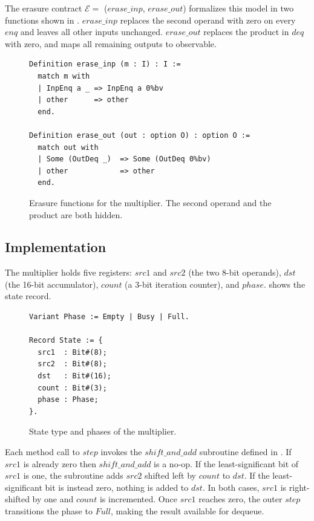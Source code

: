 \documentclass[fontset=fira-newtxsf]{mitthesis}
\theoremstyle{definition}
\theoremstyle{plain}
\begin{document}
The erasure contract $\mathcal{E} =$ ($\mathit{erase\_inp}$, $\mathit{erase\_out}$) formalizes this model in two functions shown in .
$\mathit{erase\_inp}$ replaces the second operand with zero on every $\mathit{enq}$ and leaves all other inputs unchanged.
$\mathit{erase\_out}$ replaces the product in $\mathit{deq}$ with zero, and maps all remaining outputs to observable.

\begin{figure}[ht]
\begin{verbatim}
Definition erase_inp (m : I) : I :=
  match m with
  | InpEnq a _ => InpEnq a 0%bv
  | other      => other
  end.

Definition erase_out (out : option O) : option O :=
  match out with
  | Some (OutDeq _)  => Some (OutDeq 0%bv)
  | other            => other
  end.
\end{verbatim}
\caption[Multiplier erasure functions]{Erasure functions for the multiplier. The second operand and the product are both hidden.}
\label{fig:mult-erasure}
\end{figure}

\subsection{Implementation}

The multiplier holds five registers: $\mathit{src1}$ and $\mathit{src2}$ (the two 8-bit operands), $\mathit{dst}$ (the 16-bit accumulator), $\mathit{count}$ (a 3-bit iteration counter), and $\mathit{phase}$.
 shows the state record.

\begin{figure}[ht]
\begin{verbatim}
Variant Phase := Empty | Busy | Full.

Record State := {
  src1  : Bit#(8);
  src2  : Bit#(8);
  dst   : Bit#(16);
  count : Bit#(3);
  phase : Phase;
}.
\end{verbatim}
\caption[Multiplier state type]{State type and phases of the multiplier.}
\label{fig:mult-state}
\end{figure}

Each method call to $\mathit{step}$ invokes the $\mathit{shift\_and\_add}$ subroutine defined in .
If $\mathit{src1}$ is already zero then $\mathit{shift\_and\_add}$ is a no-op. If the least-significant bit of $\mathit{src1}$ is one, the subroutine adds $\mathit{src2}$ shifted left by $\mathit{count}$ to $\mathit{dst}$. If the least-significant bit is instead zero, nothing is added to $\mathit{dst}$.
In both cases, $\mathit{src1}$ is right-shifted by one and $\mathit{count}$ is incremented.
Once $\mathit{src1}$ reaches zero, the outer $\mathit{step}$ transitions the phase to $\mathit{Full}$, making the result available for dequeue.
\end{document}
